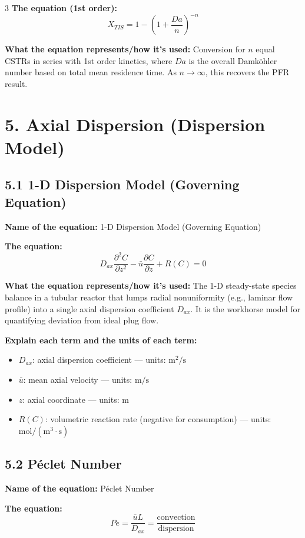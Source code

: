 \documentclass[8pt]{extarticle}
\begin{document}
\begin{multicols*}{3}
\textbf{The equation (1st order):}
\[
X_{TIS}=1-\left(1+\frac{Da}{n}\right)^{-n}
\]

\textbf{What the equation represents/how it's used:} Conversion for \(n\) equal CSTRs in series with 1st order kinetics, where \(Da\) is the overall Damk\"ohler number based on total mean residence time. As \(n\to\infty\), this recovers the PFR result.

\section*{5. Axial Dispersion (Dispersion Model)}

\subsection*{5.1 1-D Dispersion Model (Governing Equation)}

\textbf{Name of the equation:} 1-D Dispersion Model (Governing Equation)

\textbf{The equation:}
\[
D_{ax}\frac{\partial^2 C}{\partial z^2}
-
\bar{u}\frac{\partial C}{\partial z}
+
R(C)
=
0
\]

\textbf{What the equation represents/how it's used:} The 1-D steady-state species balance in a tubular reactor that lumps radial nonuniformity (e.g., laminar flow profile) into a single axial dispersion coefficient \(D_{ax}\). It is the workhorse model for quantifying deviation from ideal plug flow.

\textbf{Explain each term and the units of each term:}
\begin{itemize}
\item \(D_{ax}\): axial dispersion coefficient --- units: \(\mathrm{m^2/s}\)
\item \(\bar{u}\): mean axial velocity --- units: \(\mathrm{m/s}\)
\item \(z\): axial coordinate --- units: \(\mathrm{m}\)
\item \(R(C)\): volumetric reaction rate (negative for consumption) --- units: \(\mathrm{mol/(m^3\cdot s)}\)
\end{itemize}

\subsection*{5.2 P\'eclet Number}

\textbf{Name of the equation:} P\'eclet Number

\textbf{The equation:}
\[
Pe=\frac{\bar{u}L}{D_{ax}}=\frac{\text{convection}}{\text{dispersion}}
\]


\end{multicols*}
\end{document}
